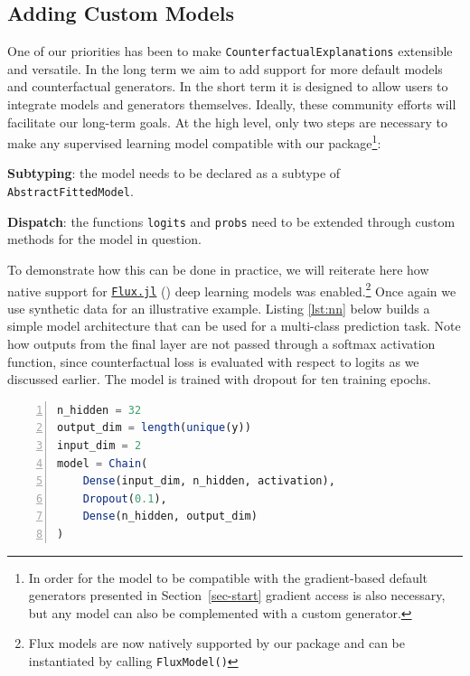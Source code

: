 \documentclass{juliacon}
\begin{document}
\hypertarget{sec-custom}{%
\subsection{Adding Custom Models}\label{sec-custom}}

One of our priorities has been to make
\texttt{CounterfactualExplanations} extensible and versatile. In the
long term we aim to add support for more default models and
counterfactual generators. In the short term it is designed to allow
users to integrate models and generators themselves. Ideally, these
community efforts will facilitate our long-term goals. At the high
level, only two steps are necessary to make any supervised learning
model compatible with our package\footnote{In order for the model to be
  compatible with the gradient-based default generators presented in
  Section~\ref{sec-start} gradient access is also necessary, but any
  model can also be complemented with a custom generator.}:

\begin{unnumlist}
\item \textbf{Subtyping}: the model needs to be declared as a subtype of \texttt{AbstractFittedModel}.
\item \textbf{Dispatch}: the functions \texttt{logits} and \texttt{probs} need to be extended through custom methods for the model in question.
\end{unnumlist}

To demonstrate how this can be done in practice, we will reiterate here
how native support for \href{https://fluxml.ai/}{\texttt{Flux.jl}}
(\cite{innes2018flux}) deep learning models was enabled.\footnote{Flux
  models are now natively supported by our package and can be
  instantiated by calling \texttt{FluxModel()}} Once again we use
synthetic data for an illustrative example. Listing \ref{lst:nn} below
builds a simple model architecture that can be used for a multi-class
prediction task. Note how outputs from the final layer are not passed
through a softmax activation function, since counterfactual loss is
evaluated with respect to logits as we discussed earlier. The model is
trained with dropout for ten training epochs.

\begin{lstlisting}[language=Julia, escapechar=@, numbers=left, label={lst:nn}, caption={.}]
n_hidden = 32
output_dim = length(unique(y))
input_dim = 2
model = Chain(
    Dense(input_dim, n_hidden, activation),
    Dropout(0.1),
    Dense(n_hidden, output_dim)
)  
\end{lstlisting}
\end{document}
